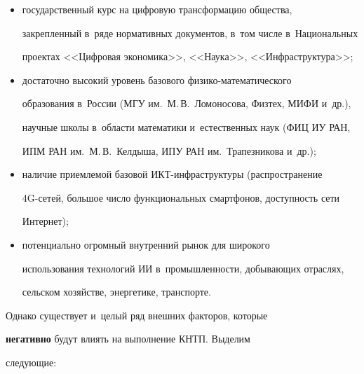     \begin{itemize}

\item государственный курс на цифровую трансформацию общества, 

закрепленный в~ряде нормативных документов, в~том числе в~Национальных 

проектах <<Цифровая экономика>>, <<Наука>>, <<Инфраструктура>>;

\item достаточно высокий уровень базового физико-математического 

образования в~России (МГУ им.\ М.\,В.~Ломоносова, Физтех, МИФИ и~др.), 

научные школы в~области математики и~естественных наук (ФИЦ ИУ РАН, 

ИПМ РАН им.\ М.\,В.~Келдыша, ИПУ РАН им.\ Трапезникова и~др.); 

\item наличие приемлемой базовой ИКТ-инфраструктуры (распространение 

4G-се\-тей, большое число функциональных смартфонов, доступность сети 

Интернет);

\item потенциально огромный внутренний рынок для широкого 

использования технологий ИИ в~промышленности, добывающих отраслях, 

сельском хозяйстве, энергетике, транспорте. 

\end{itemize}

    

    Однако существует и~целый ряд внешних факторов, которые 

\textbf{негативно} будут влиять на выполнение КНТП. Выделим 

следующие: 

